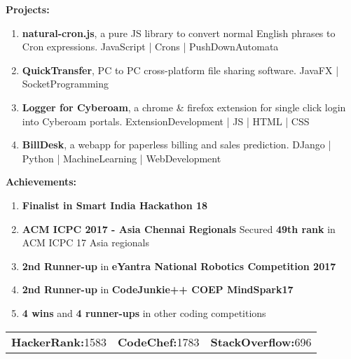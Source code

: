 \documentclass[a4paper,11pt]{article}
\begin{document}
\begin{center}
\begin{minipage}[t]{0.6\textwidth}
\begin{LARGE}
				\textbf{Projects:}\medskip%
				{\small
					\begin{enumerate}
            \item \textbf{natural-cron.js}, a pure JS library to convert normal English phrases to Cron expressions.\linebreak
						JavaScript | Crons | PushDownAutomata
						\item \textbf{QuickTransfer}, PC to PC cross-platform file sharing software.\linebreak
						JavaFX | SocketProgramming
						\item \textbf{Logger for Cyberoam}, a chrome \& firefox extension for single click login into Cyberoam portals.\linebreak
						ExtensionDevelopment | JS | HTML | CSS
						\item \textbf{BillDesk}, a webapp for paperless billing and sales prediction.\linebreak
						DJango | Python | MachineLearning | WebDevelopment
					\end{enumerate}
				}
			\end{LARGE}
			\vspace{0.65cm}
            \begin{LARGE}
				\textbf{Achievements:}\medskip%
				{\small
					\begin{enumerate}
						\item \textbf{Finalist in Smart India Hackathon 18}
						\item \textbf{ACM ICPC 2017 - Asia Chennai Regionals}\linebreak
						Secured \textbf{49th rank} in ACM ICPC 17 Asia regionals
						\item \textbf{2nd Runner-up} in \textbf{eYantra National Robotics Competition 2017}
						\item \textbf{2nd Runner-up} in \textbf{CodeJunkie++ COEP MindSpark17}
						\item \textbf{4 wins} and \textbf{4 runner-ups} in other coding competitions
					\end{enumerate}
				}
			\end{LARGE}
			\vspace{0.35cm}
			\begin{normalsize}
				\begin{tabu} to \textwidth {X[l]X[c]X[r]}
					\textbf{HackerRank:}1583 & \textbf{CodeChef:}1783 & \textbf{StackOverflow:}696
				\end{tabu}
			\end{normalsize}

\end{minipage}
\end{center}
\end{document}
